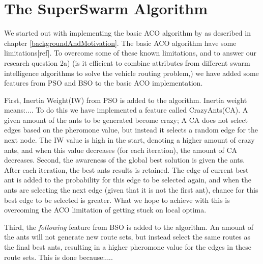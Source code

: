 \section{The SuperSwarm Algorithm}

We started out with implementing the basic ACO algorithm by \citet{nanda11} as described in chapter \ref{backgroundAndMotivation}. The basic ACO algorithm have some limitations[ref]. To overcome some of these known limitations, and to answer our research question 2a) (is it efficient to combine attributes from different swarm intelligence algorithms to solve the vehicle routing problem,) we have added some features from PSO and BSO to the basic ACO implementation.

First, Inertia Weight(IW) from PSO is added to the algorithm. Inertia weight means:.... To do this we have implemented a feature called CrazyAnts(CA). A given amount of the ants to be generated become crazy; A CA does not select edges based on the pheromone value, but instead it selects a random edge for the next node. The IW value is high in the start, denoting a higher amount of crazy ants, and when this value decreases (for each iteration), the amount of CA decreases. Second, the awareness of the global best solution is given the ants. After each iteration, the best ants results is retained. The edge of current best ant is added to the probability for this edge to be selected again, and when the ants are selecting the next edge (given that it is not the first ant), chance for this best edge to be selected is greater. What we hope to achieve with this is overcoming the ACO limitation of getting stuck on local optima.

Third, the \textit{following} feature from BSO is added to the algorithm. An amount of the ants will not generate new route sets, but instead select the same routes as the final best ants, resulting in a higher pheromone value for the edges in these route sets. This is done because:....




